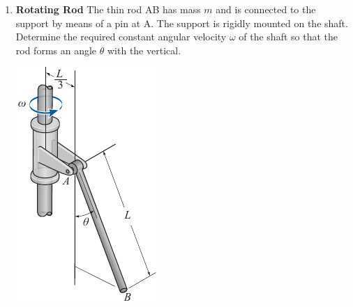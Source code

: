 \documentclass[11pt, english, a4paper, twoside]{article}
\begin{document}
\begin{enumerate}
	\item 
	\begin{minipage}[t][4.5cm]{0.75\textwidth}
		\textbf{Rotating Rod}
		The thin rod AB has mass \(m\) and is connected to the support by means of a pin at A.
		The support is rigidly mounted on the shaft.
		Determine the required constant angular velocity \(\omega\) of the shaft so that the rod forms an angle \(\theta\) with the vertical.
	\end{minipage}
	\begin{minipage}[c][3cm][t]{0.2\textwidth}
		\includegraphics[width=\textwidth]{figures/hibb_21-45}
	\end{minipage}



\end{enumerate}
\end{document}
